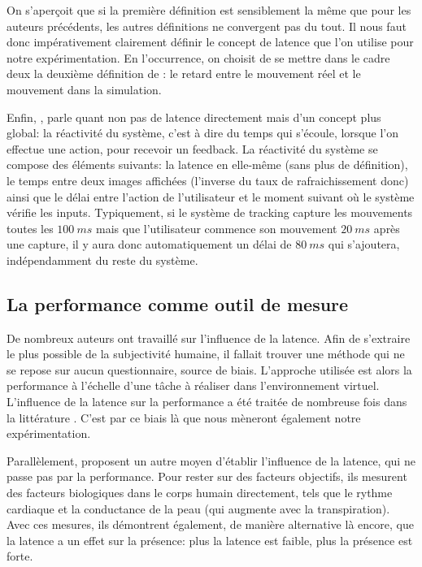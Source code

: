 	\par On s'aperçoit que si la première définition est sensiblement la même que pour les auteurs précédents, les autres définitions ne convergent pas du tout. Il nous faut donc impérativement clairement définir le concept de latence que l'on utilise pour notre expérimentation. En l'occurrence, on choisit de se mettre dans le cadre deux la deuxième définition de \citep{hale_handbook_2015}: le retard entre le mouvement réel et le mouvement dans la simulation.
	
	\par Enfin, \citep{watson_effects_1998}, parle quant non pas de latence directement mais d'un concept plus global: la réactivité du système, c'est à dire du temps qui s'écoule, lorsque l'on effectue une action, pour recevoir un feedback. La réactivité du système se compose des éléments suivants: la latence en elle-même (sans plus de définition), le temps entre deux images affichées (l'inverse du taux de rafraichissement donc) ainsi que le délai entre l'action de l'utilisateur et le moment suivant où le système vérifie les inputs. Typiquement, si le système de tracking capture les mouvements toutes les $100~ms$ mais que l'utilisateur commence son mouvement $20~ms$ après une capture, il y aura donc automatiquement un délai de $80~ms$	qui s'ajoutera, indépendamment du reste du système.
	
	\subsection{La performance comme outil de mesure}
	\par De nombreux auteurs ont travaillé sur l'influence de la latence. Afin de s'extraire le plus possible de la subjectivité humaine, il fallait trouver une méthode qui ne se repose sur aucun questionnaire, source de biais. L'approche utilisée est alors la performance à l'échelle d'une tâche à réaliser dans l'environnement virtuel. L'influence de la latence sur la performance a été traitée de nombreuse fois dans la littérature \citep{ellis_sensor_1999,mania_perceptual_2004,watson_effects_1998,papadakis_system_2011,meehan_effect_2003}. C'est par ce biais là que nous mèneront également notre expérimentation.
	
	\par Parallèlement, \citep{meehan_effect_2003} proposent un autre moyen d'établir l'influence de la latence, qui ne passe pas par la performance. Pour rester sur des facteurs objectifs, ils mesurent des facteurs biologiques dans le corps humain directement, tels que le rythme cardiaque et la conductance de la peau (qui augmente avec la transpiration). Avec ces mesures, ils démontrent également, de manière alternative là encore, que la latence a un effet sur la présence: plus la latence est faible, plus la présence est forte.
	
